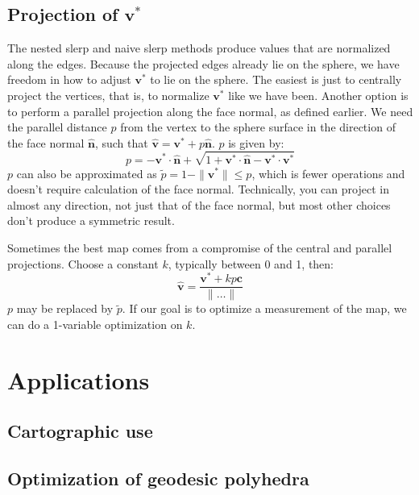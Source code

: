 \documentclass{amsart}[12pt]
\begin{document}
\subsection{Projection of $\mathbf v^*$}
The nested slerp and naive slerp methods produce values that are normalized
along the edges. Because the projected edges already lie on the sphere, we have
freedom in how to adjust $\mathbf v^*$ to lie on the sphere. The easiest is
just to centrally project the vertices, that is, to normalize $\mathbf v^*$
like we have been. Another option is to perform a parallel projection along the
face normal, as defined earlier. We need the parallel distance $p$ from the
vertex to the sphere surface in the direction of the face normal
$\hat{\mathbf n}$, such that $\hat{\mathbf v} =
\mathbf v^* + p\hat{\mathbf n}$. $p$ is given by:
\begin{equation}
   p = -\mathbf v^* \cdot \hat{\mathbf n} +
   \sqrt{1+\mathbf v^* \cdot \hat{\mathbf n}-\mathbf v^* \cdot \mathbf v^*}
\end{equation}
$p$ can also be approximated as $\widetilde{p} = 1 - \|\mathbf v^*\|
\leq p$, which is fewer operations and doesn't require
calculation of the face normal. Technically, you can project in almost any
direction, not just that of the face normal, but most other choices don't
produce a symmetric result.

Sometimes the best map comes from a compromise of the central and
parallel projections. Choose a constant $k$, typically between 0 and 1, then:
\begin{equation}
  \hat{\mathbf v} = \frac{\mathbf v^* + kp\mathbf c}{\|\dots\|}
\end{equation}
$p$ may be replaced by $\widetilde{p}$. If our goal is to optimize a
measurement of the map, we can do a 1-variable optimization on $k$.

\section{Applications}
\subsection{Cartographic use}

\subsection{Optimization of geodesic polyhedra}



\end{document}
